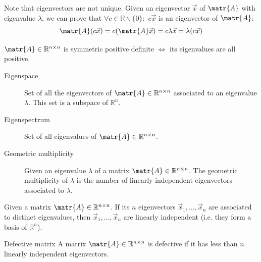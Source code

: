 Note that eigenvectors are not unique.
Given an eigenvector $\vec{x}$ of $\matr{A}$ with eigenvalue $\lambda$, 
we can prove that $\forall c \in \mathbb{R} \smallsetminus \{0\}:$ $c\vec{x}$ is an eigenvector of $\matr{A}$:
\[ \matr{A}(c\vec{x}) = c(\matr{A}\vec{x}) = c\lambda\vec{x} = \lambda(c\vec{x}) \]


\begin{theorem} 
    $\matr{A} \in \mathbb{R}^{n \times n}$ is symmetric positive definite $\iff$
    its eigenvalues are all positive.
\end{theorem}

\begin{description}
    \item[Eigenspace] 
        Set of all the eigenvectors of $\matr{A} \in \mathbb{R}^{n \times n}$ associated to an eigenvalue $\lambda$.
        This set is a subspace of $\mathbb{R}^n$.
    
    \item[Eigenspectrum] 
        Set of all eigenvalues of $\matr{A} \in \mathbb{R}^{n \times n}$.
\end{description}


\begin{description}
    \item[Geometric multiplicity] 
        Given an eigenvalue $\lambda$ of a matrix $\matr{A} \in \mathbb{R}^{n \times n}$.
        The geometric multiplicity of $\lambda$ is the number of linearly independent eigenvectors associated to $\lambda$.
\end{description}


\begin{theorem} 
    Given a matrix $\matr{A} \in \mathbb{R}^{n \times n}$. 
    If its $n$ eigenvectors $\vec{x}_1, \dots, \vec{x}_n$ are associated to distinct eigenvalues, 
    then $\vec{x}_1, \dots, \vec{x}_n$ are linearly independent (i.e. they form a basis of $\mathbb{R}^n$).

    \begin{descriptionlist}
        \item[Defective matrix] 
            A matrix $\matr{A} \in \mathbb{R}^{n \times n}$ is defective if it has less than $n$ linearly independent eigenvectors.
    \end{descriptionlist}
\end{theorem}


